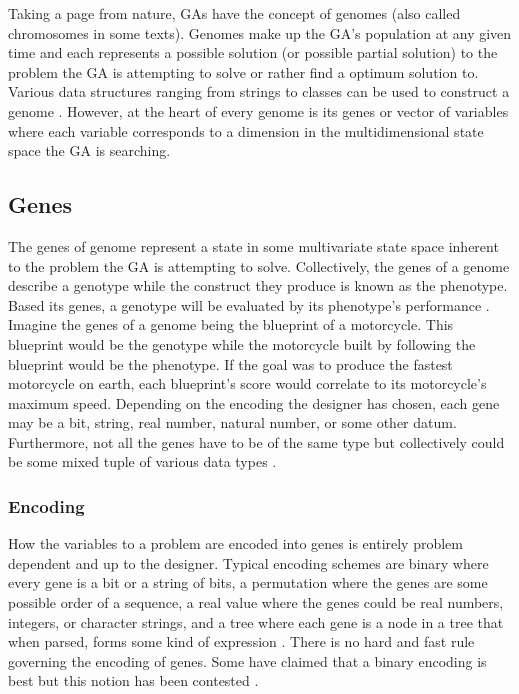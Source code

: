 Taking a page from nature, GAs have the concept of genomes (also called chromosomes in some texts). Genomes make up the GA's population at any given time and each represents a possible solution (or possible partial solution) to the problem the GA is attempting to solve or rather find a optimum solution to. Various data structures ranging from strings to classes can be used to construct a genome \cite{ColinReeves}. However, at the heart of every genome is its genes or vector of variables where each variable corresponds to a dimension in the multidimensional state space the GA is searching.      

\subsection{Genes}

The genes of genome represent a state in some multivariate state space inherent to the problem the GA is attempting to solve. Collectively, the genes of a genome describe a genotype while the construct they produce is known as the phenotype. Based its genes, a genotype will be evaluated by its phenotype's performance \cite{Beasley93anoverview}. Imagine the genes of a genome being the blueprint of a motorcycle. This blueprint would be the genotype while the motorcycle built by following the blueprint would be the phenotype. If the goal was to produce the fastest motorcycle on earth, each blueprint's score would correlate to its motorcycle's maximum speed. Depending on the encoding the designer has chosen, each gene may be a bit, string, real number, natural number, or some other datum. Furthermore, not all the genes have to be of the same type but collectively could be some mixed tuple of various data types \cite{ColinReeves}.      

\subsubsection{Encoding}

How the variables to a problem are encoded into genes is entirely problem dependent and up to the designer. Typical encoding schemes are binary where every gene is a bit or a string of bits, a permutation where the genes are some possible order of a sequence, a real value where the genes could be real numbers, integers, or character strings, and a tree where each gene is a node in a tree that when parsed, forms some kind of expression \cite{encoding_schemes}. There is no hard and fast rule governing the encoding of genes. Some have claimed that a binary encoding is best but this notion has been contested \cite{ColinReeves}.   

